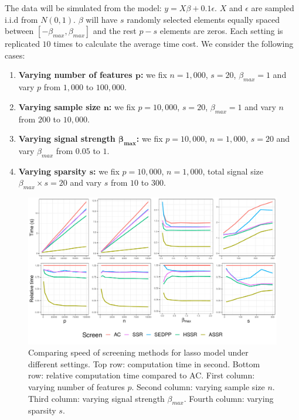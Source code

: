 \documentclass{article}
\begin{document}
The data will be simulated from the model: $y=X\beta+0.1\epsilon$. $X$ and $\epsilon$ are sampled i.i.d from $N(0,1)$. $\beta$ will have $s$ randomly selected elements equally spaced between $[-\beta_{max},\beta_{max}]$ and the rest $p-s$ elements are zeros. Each setting is replicated $10$ times to calculate the average time cost. We consider the following cases:

\begin{enumerate}
    \item \textbf{Varying number of features $\mathbf{p}$:} we fix $n=1,000$, $s=20$, $\beta_{max}=1$ and vary $p$ from $1,000$ to $100,000$.
    \item \textbf{Varying sample size $\mathbf{n}$:} we fix $p=10,000$, $s=20$, $\beta_{max}=1$ and vary $n$ from $200$ to $10,000$.
    \item \textbf{Varying signal strength $\mathbf{\beta_{max}}$:} we fix $p=10,000$, $n=1,000$, $s=20$ and vary $\beta_{max}$ from $0.05$ to $1$.
    \item \textbf{Varying sparsity $\mathbf{s}$:} we fix $p=10,000$, $n=1,000$, total signal size $\beta_{max}\times s=20$ and vary $s$ from $10$ to $300$.
\end{enumerate}

\begin{figure}[h]
    \centering
    \includegraphics[scale = 0.59]{plots/gaus1.pdf}    \caption{Comparing speed of screening methods for lasso model under different settings. Top row: computation time in second. Bottom row: relative computation time compared to AC. First column: varying number of features $p$. Second column: varying sample size $n$. Third column: varying signal strength $\beta_{max}$. Fourth column: varying sparsity $s$.}
    \label{fig:5.1.1}
\end{figure}
\end{document}
